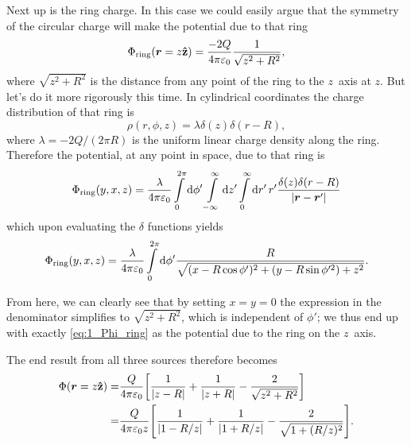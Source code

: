 \documentclass[11pt,letter, swedish, english
]{article}
\let\oldint\int
\renewcommand{\int}{\oldint\limits}
\newcommand{\enaught}{\ensuremath\varepsilon_0}
\begin{document}
Next up is the ring charge. In this case we could easily argue that
the symmetry of the circular charge will make the potential due to
that ring 
\begin{equation}\label{eq:1_Phi_ring}
\Phi_\text{ring}(\vb*r=z\vu{z})=\frac{-2Q}{4\pi\enaught}
\frac{1}{\sqrt{z^2+R^2}},
\end{equation}
where $\sqrt{z^2+R^2}$ is the distance from any point of the ring to
the $z$~axis at $z$. But let's do it more rigorously this time. In
cylindrical coordinates the charge distribution of that ring
is\footnotemark{} 
\begin{equation}
\rho(r, \phi, z)=\lambda \delta(z)\delta(r-R),
\end{equation}
where $\lambda=-2Q/(2\pi R)$ is the uniform linear charge density
along the ring. 
Therefore the potential, at any point in space, due to that ring is
\begin{equation}
\Phi_\text{ring}(y, x, z)=\frac{\lambda}{4\pi\enaught}
\int_0^{2\pi}\rd\phi'\int_{-\infty}^\infty\rd{z'}\int_0^\infty\rd{r'}\,r'
\frac{\delta(z)\delta(r-R)}{\abs{\vb*r-\vb*r'}}
\end{equation}
which upon evaluating the $\delta$ functions yields
\begin{equation}
\Phi_\text{ring}(y, x, z)
= \frac{\lambda}{4\pi\enaught} \int_0^{2\pi}\rd\phi'
\frac{R}{\sqrt{(x-R\cos\phi')^2+(y-R\sin\phi'^2)+z^2}}.
\end{equation}

From here, we can clearly see that by setting $x=y=0$ the expression
in the denominator simplifies to $\sqrt{z^2+R^2}$, which is
independent of $\phi'$; we thus end up with exactly
\eqref{eq:1_Phi_ring} as the potential due to the ring on the
$z$~axis.  

The end result from all three sources therefore becomes
\begin{align}\label{eq:1_Phi_a}
\Phi(\vb*r=z\vu{z})=&\frac{Q}{4\pi\enaught}
\qty[\frac{1}{\abs{z-R}}+\frac{1}{\abs{z+R}}
-\frac{2}{\sqrt{z^2+R^2}}]
\\\label{eq:1_Phi_b}
=&\frac{Q}{4\pi\enaught z}
\qty[\frac{1}{\abs{1-R/z}}+\frac{1}{\abs{1+R/z}}
-\frac{2}{\sqrt{1+(R/z)^2}}].
\end{align}
\end{document}
